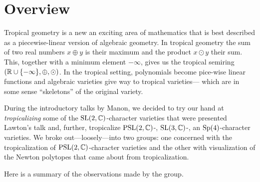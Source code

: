 \documentclass[11pt]{article}
\begin{document}
\renewcommand*{\thefootnote}{\fnsymbol{footnote}}


\author[1]{Shams Alyusof}
\author[4]{Corry Bedwell}
\author[2]{Ellie Dannenberg}
\author[5]{Dmitry Gekhtman}
\author[1]{Charlie Katerba}
\author[1]{Jack Love}
\author[1]{Christopher Manon}
\author[3]{Giuseppe Martone}
\author[6]{\href{mailto:\eemail}{\auth}}%

\renewcommand\Authands{ and }
\title{\tight}%
\date{\today}%

\maketitle
\section{Overview}
Tropical geometry is a new an exciting area of mathematics that is best
described as a piecewise-linear version of algebraic geometry. In tropical
geometry the sum of two real numbers $x\oplus y$ is their maximum and the
product $x\odot y$ their sum. This, together with a minimum element
$-\infty$, gives us the tropical semiring
$(\mathbb{R}\cup\{-\infty\},\oplus,\odot)$. In the tropical setting, polynomials
become pice-wise linear functions and algebraic varieties give way to
tropical varieties--- which are in some sense ``skeletons'' of the original
variety.

During the introductory talks by Manon, we decided to try our hand at
\emph{tropicalizing} some of the $\mathrm{SL}(2,\mathbb{C})$-character varieties that
were presented Lawton's talk and, further, tropicalize $\mathrm{PSL}(2,\mathbb{C})$-,
$\mathrm{SL}(3,\mathbb{C})$-, an $\mathrm{Sp}(4)$-character varieties. We broke
out---loosely---into two groups: one concerned with the tropicalization of
$\mathrm{PSL}(2,\mathbb{C})$-character varieties and the other with visualization of the
Newton polytopes that came about from tropicalization.

Here is a summary of the observations made by the group.
\end{document}
